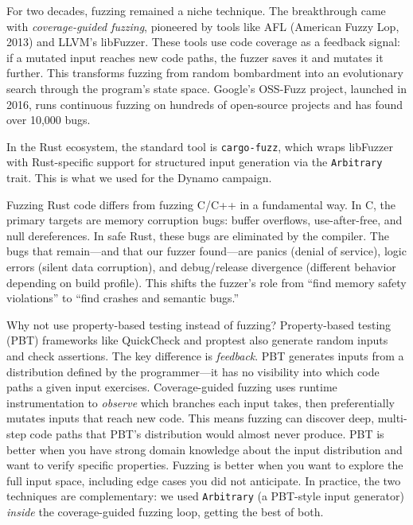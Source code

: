%
For two decades, fuzzing remained a niche technique. The breakthrough came with \emph{coverage-guided fuzzing}, pioneered by tools like AFL (American Fuzzy Lop, 2013) and LLVM's libFuzzer. These tools use code coverage as a feedback signal: if a mutated input reaches new code paths, the fuzzer saves it and mutates it further. This transforms fuzzing from random bombardment into an evolutionary search through the program's state space. Google's OSS-Fuzz project, launched in 2016, runs continuous fuzzing on hundreds of open-source projects and has found over 10,000 bugs.

In the Rust ecosystem, the standard tool is \texttt{cargo-fuzz}, which wraps libFuzzer with Rust-specific support for structured input generation via the \texttt{Arbitrary} trait. This is what we used for the Dynamo campaign.

\begin{notebox}
Fuzzing Rust code differs from fuzzing C/C++ in a fundamental way. In C, the primary targets are memory corruption bugs: buffer overflows, use-after-free, and null dereferences. In safe Rust, these bugs are eliminated by the compiler. The bugs that remain---and that our fuzzer found---are panics (denial of service), logic errors (silent data corruption), and debug/release divergence (different behavior depending on build profile). This shifts the fuzzer's role from ``find memory safety violations'' to ``find crashes and semantic bugs.''
\end{notebox}

\begin{whynotbox}{Why not use property-based testing instead of fuzzing?}
Property-based testing (PBT) frameworks like QuickCheck and proptest also generate random inputs and check assertions. The key difference is \emph{feedback}. PBT generates inputs from a distribution defined by the programmer---it has no visibility into which code paths a given input exercises. Coverage-guided fuzzing uses runtime instrumentation to \emph{observe} which branches each input takes, then preferentially mutates inputs that reach new code. This means fuzzing can discover deep, multi-step code paths that PBT's distribution would almost never produce. PBT is better when you have strong domain knowledge about the input distribution and want to verify specific properties. Fuzzing is better when you want to explore the full input space, including edge cases you did not anticipate. In practice, the two techniques are complementary: we used \texttt{Arbitrary} (a PBT-style input generator) \emph{inside} the coverage-guided fuzzing loop, getting the best of both.
\end{whynotbox}

